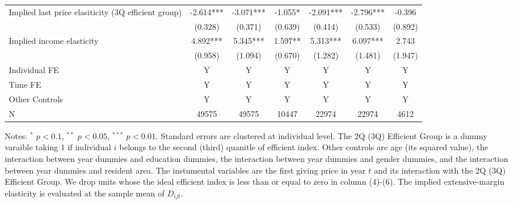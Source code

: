 \documentclass[ review  , 3p ]{elsarticle}
\begin{document}
\begin{table}
\begin{threeparttable}
\begin{tabular}[t]{lcccccc}
  Implied last price elasiticity (3Q efficient group) & -2.614*** & -3.071*** & -1.055* & -2.091*** & -2.796*** & -0.396\\
   & (0.328) & (0.371) & (0.639) & (0.414) & (0.533) & (0.892)\\
  Implied income elasticity & 4.892*** & 5.345*** & 1.597** & 5.313*** & 6.097*** & 2.743\\
   & (0.958) & (1.094) & (0.670) & (1.282) & (1.481) & (1.947)\\
  Individual FE & Y & Y & Y & Y & Y & Y\\
  Time FE & Y & Y & Y & Y & Y & Y\\
  Other Controls & Y & Y & Y & Y & Y & Y\\
  N & 49575 & 49575 & 10447 & 22974 & 22974 & 4612\\
  \bottomrule
  \end{tabular}
  \begin{tablenotes}
  \item Notes: $^{*}$ $p < 0.1$, $^{**}$ $p < 0.05$, $^{***}$ $p < 0.01$. Standard errors are clustered at individual level. The 2Q (3Q) Efficient Group is a dummy varaible taking 1 if individual $i$ belongs to the second (third) quanitle of efficient index. Other controls are age (its squared value), the interaction between year dummies and education dummies, the interaction between year dummies and gender dummies, and the interaction between year dummies and resident area. The instumental variables are the first giving price in year $t$ and its interaction with the 2Q (3Q) Efficient Group. We drop units whose the ideal efficient index is less than or equal to zero in column (4)-(6). The implied extensive-margin elasticity is evaluated at the sample mean of $D_{ijt}$.
  \end{tablenotes}
  \end{threeparttable}
  \end{table}
  
\end{document}
